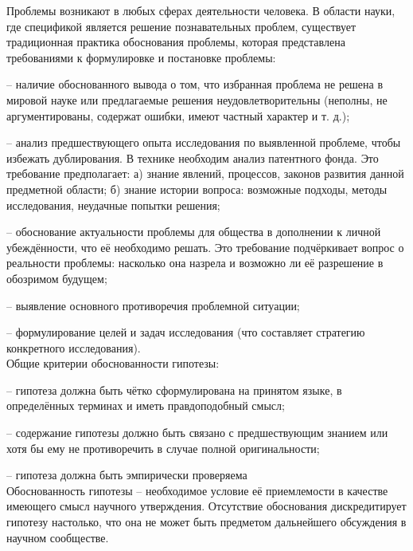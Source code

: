 \documentclass[exam_answers.tex]{subfiles}
\begin{document}
\renewcommand{\baselinestretch}{0.75}

Проблемы возникают в любых сферах деятельности человека.
В области науки, где спецификой является решение познавательных проблем, существует традиционная практика обоснования проблемы, которая представлена требованиями к формулировке и постановке проблемы:

-- наличие обоснованного вывода о том, что избранная проблема не решена в мировой науке или предлагаемые решения неудовлетворительны (неполны, не аргументированы, содержат ошибки, имеют частный характер и т. д.);

-- анализ предшествующего опыта исследования по выявленной проблеме, чтобы избежать дублирования. В технике необходим анализ патентного фонда.
Это требование предполагает:
а) знание явлений, процессов, законов развития данной предметной области;
б) знание истории вопроса: возможные подходы, методы исследования, неудачные попытки решения;

-- обоснование актуальности проблемы для общества в дополнении к личной убеждённости, что её необходимо решать.
Это требование подчёркивает вопрос о реальности проблемы: насколько она назрела и возможно ли её разрешение в обозримом будущем;

-- выявление основного противоречия проблемной ситуации;

-- формулирование целей и задач исследования (что составляет стратегию конкретного исследования).
\\

Общие критерии обоснованности гипотезы:

-- гипотеза должна быть чётко сформулирована на принятом языке, в определённых терминах и иметь правдоподобный смысл;

-- содержание гипотезы должно быть связано с предшествующим знанием или хотя бы ему не противоречить в случае полной оригинальности;

-- гипотеза должна быть эмпирически проверяема
\\

Обоснованность гипотезы – необходимое условие её приемлемости в качестве имеющего смысл научного утверждения.
Отсутствие обоснования дискредитирует гипотезу настолько, что она не может быть предметом дальнейшего обсуждения в научном сообществе.
\end{document}
